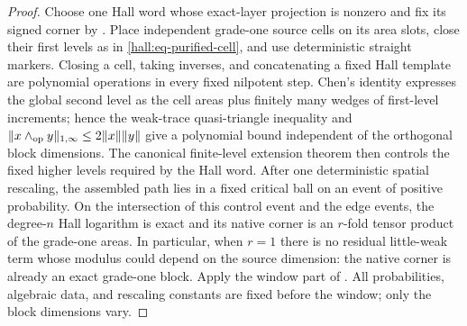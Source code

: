 \documentclass[10pt,reqno]{amsart}
\theoremstyle{plain}
\theoremstyle{definition}
\theoremstyle{remark}
\begin{document}
\begin{proof}
Choose one Hall word whose exact-layer projection is nonzero and fix its
signed corner by .
Place independent grade-one source cells on its area slots, close their first
levels as in \eqref{hall:eq-purified-cell}, and use deterministic straight
markers.  Closing a cell, taking inverses, and concatenating a fixed Hall
template are polynomial operations in every fixed nilpotent step.  Chen's
identity expresses the global second level as the cell areas plus finitely
many wedges of first-level increments; hence the weak-trace quasi-triangle
inequality and
$\|x\wedge_{\rm op}y\|_{1,\infty}\le2\|x\|\|y\|$ give a
polynomial bound independent of the orthogonal block dimensions.  The
canonical finite-level extension theorem then controls the fixed higher
levels required by the Hall word.  After one deterministic spatial rescaling,
the assembled path lies in a fixed critical ball on an event of positive
probability.  On the intersection of this
control event and the edge events, the degree-$n$ Hall logarithm is exact and
its native corner is an $r$-fold tensor product of the grade-one areas.  In
particular, when $r=1$ there is no residual little-weak term whose modulus
could depend on the source dimension: the native corner is already an exact
grade-one block.  Apply the window part of
.  All
probabilities, algebraic data, and rescaling constants are fixed before the
window; only the block dimensions vary.
\end{proof}
\end{document}
